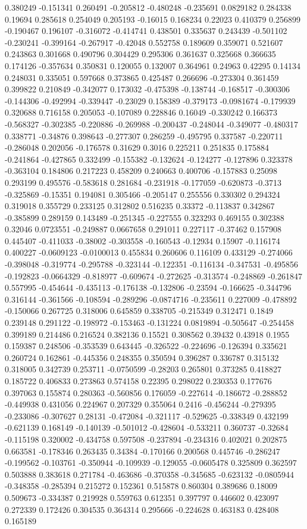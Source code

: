 0.380249 -0.151341 0.260491 -0.205812 -0.480248 -0.235691 0.0829182 0.284338 0.19694 0.285618 0.254049 0.205193 -0.16015 0.168234 0.22023 0.410379 0.256899 -0.190467 0.196107 -0.316072 -0.414741 0.438501 0.335637 0.243439 -0.501102 -0.230241 -0.399164 -0.267917 -0.42048 0.552758 0.189609 0.359071 0.521607 0.243863 0.301668 0.490796 0.304429 0.295306 0.361637 0.325668 0.366635 0.174126 -0.357634 0.350831 0.120055 0.132007 0.364961 0.24963 0.42295 0.14134 0.248031 0.335051 0.597668 0.373865 0.425487 0.266696 -0.273304 0.361459 0.399822 0.210849 -0.342077 0.173032 -0.475398 -0.138744 -0.168517 -0.300306 -0.144306 -0.492994 -0.339447 -0.23029 0.158389 -0.379173 -0.0981674 -0.179939 0.320688 0.716158 0.205053 -0.107089 0.228846 0.16049 -0.330242 0.166373 -0.568327 -0.302385 -0.220886 -0.269988 -0.200437 -0.248044 -0.349077 -0.480317 0.338771 -0.34876 0.398643 -0.277307 0.286259 -0.495795 0.337587 -0.220711 -0.286048 0.202056 -0.176578 0.31629 0.3016 0.225211 0.251835 0.175884 -0.241864 -0.427865 0.332499 -0.155382 -0.132624 -0.124277 -0.127896 0.323378 -0.363104 0.184806 0.217223 0.458209 0.240663 0.400706 -0.157883 0.25098 0.293199 0.495576 -0.583618 0.281684 -0.231918 -0.177059 -0.620873 -0.3713 -0.325869 -0.15351 0.194081 0.305466 -0.205147 0.255556 0.330302 0.294324 0.319018 0.355729 0.233125 0.312802 0.516235 0.33372 -0.113837 0.342867 -0.385899 0.289159 0.143489 -0.251345 -0.227555 0.323293 0.469155 0.302388 0.32046 0.0723551 -0.249887 0.0667658 0.291011 0.227117 -0.37462 0.157908 0.445407 -0.411033 -0.38002 -0.303558 -0.160543 -0.12934 0.15907 -0.116174 0.400227 -0.0609123 -0.0100013 0.455834 0.260606 0.116109 0.433129 -0.274066 -0.398048 -0.319774 -0.295788 -0.323144 -0.122351 -0.116134 -0.347531 -0.495856 -0.192823 -0.0664329 -0.818977 -0.609674 -0.272625 -0.313574 -0.248869 -0.261847 0.557995 -0.454644 -0.435113 -0.176138 -0.132806 -0.23594 -0.166625 -0.344796 0.316144 -0.361566 -0.108594 -0.289296 -0.0874716 -0.235611 0.227009 -0.478892 -0.150066 0.267725 0.318006 0.645859 0.338705 -0.215349 0.312471 0.1849 0.239148 0.291122 -0.198972 -0.153463 -0.131224 0.0819894 -0.505647 -0.254458 0.399189 0.214486 0.216524 0.382136 0.15521 0.308562 0.39432 0.43918 0.1955 0.159387 0.248506 -0.353539 0.643445 -0.326522 -0.224696 -0.126394 0.335621 0.260724 0.162861 -0.445356 0.248355 0.350594 0.396287 0.336787 0.315132 0.318005 0.342739 0.253711 -0.0750599 -0.28203 0.265801 0.373285 0.418827 0.185722 0.406833 0.273863 0.574158 0.22395 0.298022 0.230353 0.177676 0.397063 0.155874 0.280363 -0.560856 0.176059 -0.227614 -0.186672 -0.288852 -0.449938 0.431056 0.224967 0.207329 0.355064 0.2416 -0.456244 -0.279395 -0.233086 -0.307627 0.28131 -0.472084 -0.321117 -0.529625 -0.338349 0.432199 -0.621139 0.168149 -0.140139 -0.501012 -0.428604 -0.533211 0.360737 -0.32684 -0.115198 0.320002 -0.434758 0.597508 -0.237894 -0.234316 0.402021 0.202875 0.663581 -0.178346 0.263435 0.34384 -0.170166 0.200568 0.445746 -0.286247 -0.199562 -0.103761 -0.350944 -0.109939 -0.129055 -0.0605478 0.325809 0.362597 0.503888 0.383618 0.271784 -0.463686 -0.370358 -0.345685 -0.623132 -0.0805944 -0.348358 -0.285394 0.215272 0.152361 0.515878 0.860304 0.389686 0.18009 0.509673 -0.334387 0.219928 0.559763 0.612351 0.397797 0.446602 0.423097 0.272339 0.172426 0.304535 0.364314 0.295666 -0.224628 0.463183 0.428408 0.165189 